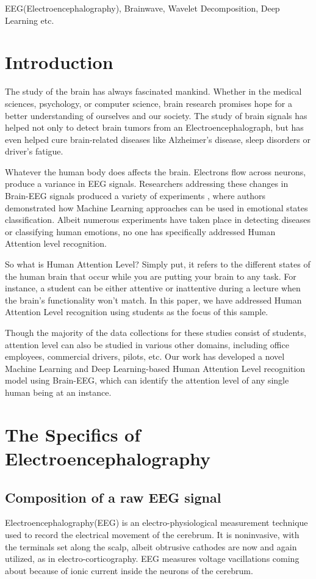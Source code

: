\documentclass[conference]{IEEEtran}
\begin{document}
\begin{IEEEkeywords}
EEG(Electroencephalography), Brainwave, Wavelet Decomposition, Deep Learning etc.  
\end{IEEEkeywords}

\section{Introduction}
The study of the brain has always fascinated mankind. Whether in the medical sciences, psychology, or computer science, brain research promises hope for a better understanding of ourselves and our society.  The study of brain signals has helped not only to detect brain tumors from an Electroencephalograph, but has even helped cure brain-related diseases like Alzheimer’s disease\cite{b5}, sleep disorders\cite{b1} or driver’s fatigue\cite{b9}.

Whatever the human body does affects the brain. Electrons flow across neurons, produce a variance in EEG signals. Researchers addressing these changes in Brain-EEG signals produced a variety of experiments \cite{b2, b4, b6, b10, b11}, where authors demonstrated how Machine Learning approaches can be used in emotional states classification. Albeit numerous experiments have taken place in detecting diseases or classifying human emotions, no one has specifically addressed Human Attention level recognition. 


So what is Human Attention Level?  Simply put, it refers to the different states of the human brain that occur while you are putting your brain to any task.  For instance, a student can be either attentive or inattentive during a lecture when the brain's functionality won't match.  In this paper, we have addressed Human Attention Level recognition using students as the focus of this sample. 

Though the majority of the data collections for these studies consist of students, attention level can also be studied in various other domains, including office employees, commercial drivers, pilots, etc. Our work has developed a novel Machine Learning and Deep Learning-based Human Attention Level recognition model using Brain-EEG, which can identify the attention level of any single human being at an instance.


\section{The Specifics of Electroencephalography}
\label{eeg}
\subsection{Composition of a raw EEG signal}
Electroencephalography(EEG) is an electro-physiological measurement technique used to record the electrical movement of the cerebrum. It is noninvasive, with the terminals set along the scalp, albeit obtrusive cathodes are now and again utilized, as in electro-corticography. EEG measures voltage vacillations coming about because of ionic current inside the neurons of the cerebrum.
\end{document}

